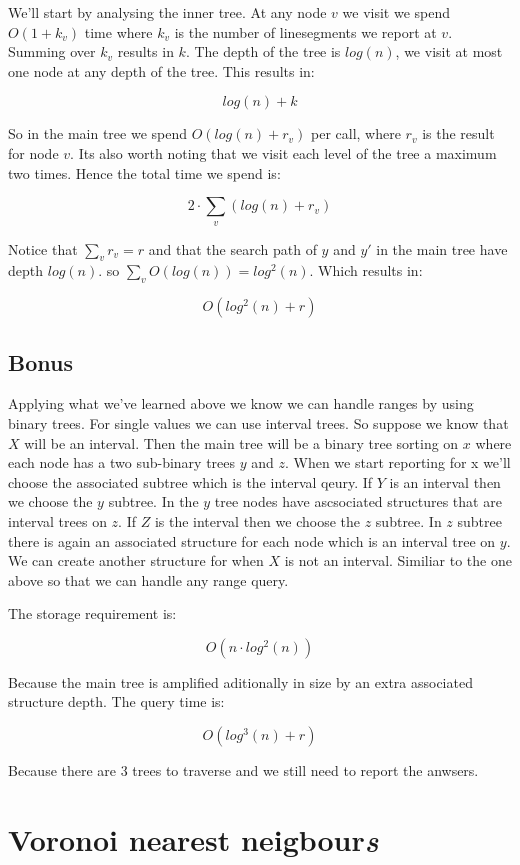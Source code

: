 \documentclass{article}
\begin{document}
We'll start by analysing the inner tree.
At any node $v$ we visit we spend $O(1+k_v)$ time where
$k_v$ is the number of linesegments we report at $v$. Summing
over $k_v$ results in $k$. The depth of the tree is $log(n)$,
we visit at most one node at any depth of the tree. This results in:

\[ log(n)+k\]

So in the main tree we spend $O(log(n)+r_v)$ per call, where $r_v$ is
the result for node $v$. Its also worth noting that we visit each level
of the tree a maximum two times. Hence the total time we spend is:

\[ 2\cdot \sum_v(log(n)+r_v)\]

Notice that $\sum_v r_v = r$ and that the search path of $y$ and $y'$
in the main tree have depth $log(n)$. so $\sum_v O(log(n))=log^2(n)$.
Which results in:

\[ O(log^2(n)+r) \]

\subsection{Bonus}
Applying what we've learned above we know we can handle ranges by using
binary trees. For single values we can use interval trees.
So suppose we know that $X$ will be an interval. Then the main tree will
be a binary tree sorting on $x$ where each node has a two sub-binary trees $y$
and $z$.
When we start reporting for x we'll choose the associated subtree which
is the interval qeury.
If $Y$ is an interval then we choose the $y$ subtree.
In the $y$ tree nodes have ascsociated structures that are interval trees
on $z$.
If $Z$ is the interval then we choose the $z$ subtree. In $z$ subtree
there is again an associated structure for each node which is an interval
tree on $y$.
We can create another structure for when $X$ is not an interval. Similiar
to the one above so that we can handle any range query.

The storage requirement is:

\[O(n\cdot log^2(n))\]

Because the main tree is amplified aditionally in size by an extra associated
structure depth.
The query time is:

\[ O(log^3(n)+r) \]

Because there are 3 trees to traverse and we still need to report the anwsers.
\section{Voronoi nearest neigbour\emph{s}}
\end{document}
